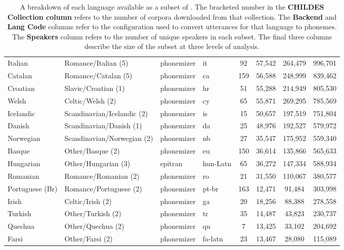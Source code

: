 \begin{table}[t]
\begin{tabular}{llllcccc}
        Italian  & Romance/Italian (5) & phonemizer & it & 92  & 57,542  & 264,479  & 996,701 \\
        Catalan  & Romance/Catalan (5) & phonemizer & ca & 159  & 56,588  & 248,999  & 839,462 \\
        Croatian  & Slavic/Croatian (1) & phonemizer & hr & 51  & 55,288  & 214,949  & 805,530 \\
        Welsh  & Celtic/Welsh (2) & phonemizer & cy & 65  & 55,871  & 269,295  & 785,569 \\
        Icelandic  & Scandinavian/Icelandic (2) & phonemizer & is & 15  & 50,657  & 197,519  & 751,804 \\
        Danish  & Scandinavian/Danish (1) & phonemizer & da & 25  & 48,976  & 192,527  & 579,972 \\
        Norwegian  & Scandinavian/Norwegian (2) & phonemizer & nb & 27  & 35,547  & 175,952  & 559,340 \\
        Basque  & Other/Basque (2) & phonemizer & eu & 150  & 36,614  & 135,866  & 565,633 \\
        Hungarian  & Other/Hungarian (3) & epitran & hun-Latn & 65  & 36,272  & 147,334  & 588,934 \\
        Romanian  & Romance/Romanian (2) & phonemizer & ro & 21  & 31,550  & 110,067  & 380,577 \\
        Portuguese (Br)  & Romance/Portuguese (2) & phonemizer & pt-br & 163  & 12,471  & 91,484  & 303,998 \\
        Irish  & Celtic/Irish (2) & phonemizer & ga & 20  & 18,256  & 88,388  & 278,558 \\
        Turkish  & Other/Turkish (2) & phonemizer & tr & 35  & 14,487  & 43,823  & 230,737 \\
        Quechua  & Other/Quechua (2) & phonemizer & qu & 7  & 13,425  & 33,102  & 204,692 \\
        Farsi  & Other/Farsi (2) & phonemizer & fa-latn & 23  & 13,467  & 28,080  & 115,089 \\
        \bottomrule
    \end{tabular}
    \caption{A breakdown of each language available as a subset of \ipachildes. The bracketed number in the \textbf{CHILDES Collection column} refers to the number of corpora downloaded from that collection. The \textbf{Backend} and \textbf{Lang Code} columns refer to the \corpusphonemizer configuration used to convert utterances for that language to phonemes. The \textbf{Speakers} column refers to the number of unique speakers in each subset. The final three columns describe the size of the subset at three levels of analysis.}
    \label{tab:dataset-phonemized-childes-sections}
\end{table}

